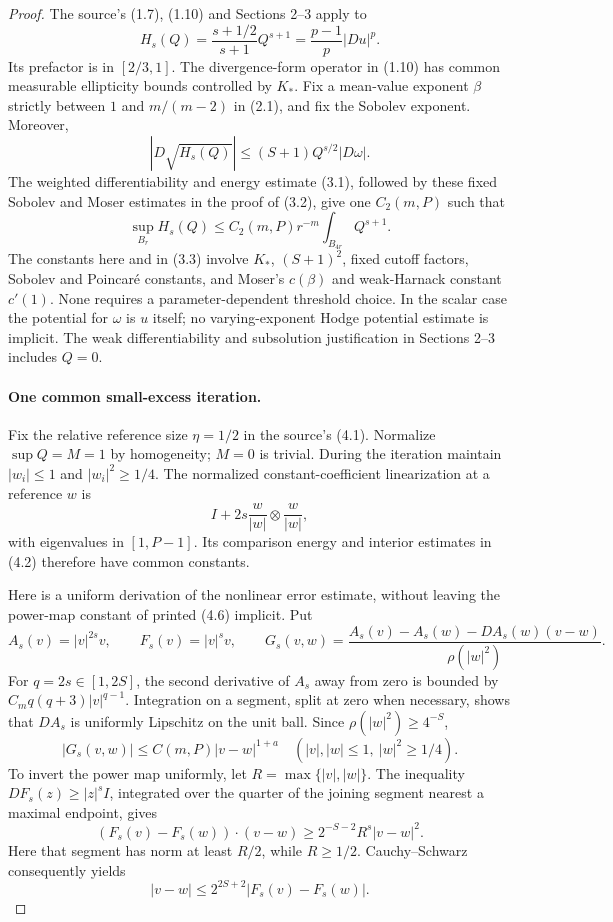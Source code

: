 \begin{proof}
The source's (1.7), (1.10) and Sections 2--3 apply to
\[
 H_s(Q)=\frac{s+1/2}{s+1}Q^{s+1}
       =\frac{p-1}{p}|Du|^p.
\]
Its prefactor is in $[2/3,1]$. The divergence-form operator in
(1.10) has common measurable ellipticity bounds controlled by
$K_*$. Fix a mean-value exponent $\beta$ strictly between $1$ and
$m/(m-2)$ in (2.1), and fix the Sobolev exponent. Moreover,
\[
 |D\sqrt{H_s(Q)}|\leq(S+1)Q^{s/2}|D\omega|.
\]
The weighted differentiability and energy estimate (3.1), followed
by these fixed Sobolev and Moser estimates in the proof of (3.2),
give one $C_2(m,P)$ such that
\begin{equation}\label{eq:compact-moser}
 \sup_{B_r}H_s(Q)\leq C_2(m,P)r^{-m}
                         \int_{B_{4r}}Q^{s+1}.
\end{equation}
The constants here and in (3.3) involve $K_*$, $(S+1)^2$, fixed
cutoff factors, Sobolev and Poincar\'e constants, and Moser's
$c(\beta)$ and weak-Harnack constant $c'(1)$. None requires a
parameter-dependent threshold choice. In the scalar case the
potential for $\omega$ is $u$ itself; no varying-exponent Hodge
potential estimate is implicit. The weak differentiability and
subsolution justification in Sections 2--3 includes $Q=0$.

\paragraph{One common small-excess iteration.}
Fix the relative reference size $\eta=1/2$ in the source's (4.1).
Normalize $\sup Q=M=1$ by homogeneity; $M=0$ is trivial. During the
iteration maintain $|w_i|\leq1$ and $|w_i|^2\geq1/4$. The
normalized constant-coefficient linearization at a reference $w$ is
\[
 I+2s\frac{w}{|w|}\otimes\frac{w}{|w|},
\]
with eigenvalues in $[1,P-1]$. Its comparison energy and interior
estimates in (4.2) therefore have common constants.

Here is a uniform derivation of the nonlinear error estimate,
without leaving the power-map constant of printed (4.6) implicit.
Put
\[
 A_s(v)=|v|^{2s}v,\qquad F_s(v)=|v|^s v,\qquad
 G_s(v,w)=\frac{A_s(v)-A_s(w)-DA_s(w)(v-w)}{\rho(|w|^2)}.
\]
For $q=2s\in[1,2S]$, the second derivative of $A_s$ away from zero
is bounded by $C_mq(q+3)|v|^{q-1}$. Integration on a segment,
split at zero when necessary, shows that $DA_s$ is uniformly
Lipschitz on the unit ball. Since $\rho(|w|^2)\geq4^{-S}$,
\begin{equation}\label{eq:compact-remainder}
 |G_s(v,w)|\leq C(m,P)|v-w|^{1+a}
 \quad (|v|,|w|\leq1,\ |w|^2\geq1/4).
\end{equation}
To invert the power map uniformly, let $R=\max\{|v|,|w|\}$.
The inequality $DF_s(z)\geq|z|^sI$, integrated over the quarter of
the joining segment nearest a maximal endpoint, gives
\[
 (F_s(v)-F_s(w))\cdot(v-w)
       \geq2^{-S-2}R^s|v-w|^2.
\]
Here that segment has norm at least $R/2$, while $R\geq1/2$.
Cauchy--Schwarz consequently yields
\begin{equation}\label{eq:compact-inverse}
 |v-w|\leq2^{2S+2}|F_s(v)-F_s(w)|.
\end{equation}


\end{proof}
